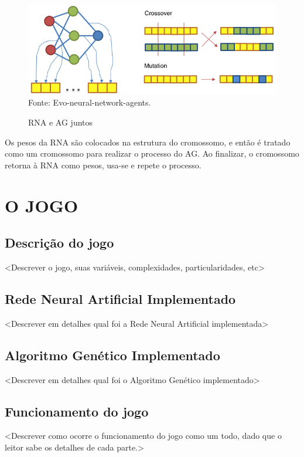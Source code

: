 \documentclass[12pt,a4paper]{article}
\newcommand{\source}[1]{\small Fonte: {#1}}
\begin{document}
	\begin{figure}[ht!]
		\centering
		\caption{RNA e AG juntos}
		\includegraphics[scale=0.7]{NeuralNetworkIntoChromosome.png}\\
		\vspace{0.5mm}
		\source{Evo-neural-network-agents.}
		\label{fig:nn-ag}
	\end{figure}
	
	Os pesos da RNA são colocados na estrutura do cromossomo,
	e então é tratado como um cromossomo para realizar o processo do AG.
	Ao finalizar, o cromossomo retorna à RNA como pesos,
	usa-se e repete o processo.

\FloatBarrier
\newpage %
\section{O JOGO}
	
	\FloatBarrier
	\subsection{Descrição do jogo}
	<Descrever o jogo, suas variáveis, complexidades, particularidades, etc>
	
	\FloatBarrier
	\subsection{Rede Neural Artificial Implementado}
	<Descrever em detalhes qual foi a Rede Neural Artificial implementada>
	
	\FloatBarrier
	\subsection{Algoritmo Genético Implementado}
	<Descrever em detalhes qual foi o Algoritmo Genético implementado>
	
	\FloatBarrier
	\subsection{Funcionamento do jogo}
	<Descrever como ocorre o funcionamento do jogo como um todo, dado que o leitor sabe os detalhes de cada parte.>
\end{document}
